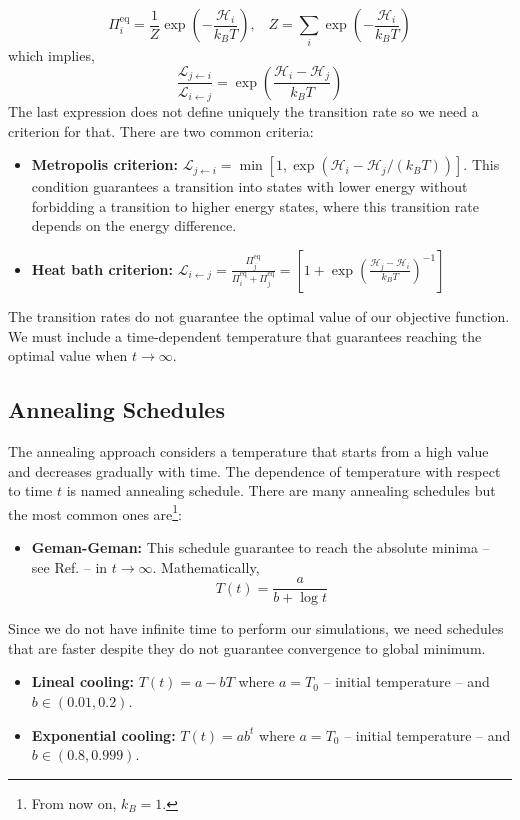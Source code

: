 \begin{equation}
    \Pi_{i}^{\mathrm{eq}} = \frac{1}{Z}\exp\left(- \frac{\mathcal{H}_{i}}{k_{B}T}\right), \;\;\; Z = \sum_{i}\exp\left(-\frac{\mathcal{H}_{i}}{k_{B}T}\right)
\end{equation}
which implies,
\begin{equation}
    \frac{\mathcal{L}_{j \leftarrow i}}{\mathcal{L}_{i \leftarrow j}} = \exp\left(\frac{\mathcal{H}_{i} - \mathcal{H}_{j}}{k_{B}T}\right)
\end{equation}
The last expression does not define uniquely the transition rate so we need a criterion for that. There are two common criteria:
\begin{itemize}
    \item\textbf{Metropolis criterion:} $\mathcal{L}_{j \leftarrow i} = \min \left[1,\exp\left(\mathcal{H}_{i}-\mathcal{H}_{j}/\left(k_{B}T\right)\right)\right]$. This condition guarantees a transition into states with lower energy without forbidding a transition to higher energy states, where this transition rate depends on the energy difference. 
    \item \textbf{Heat bath criterion:} $\mathcal{L}_{i \leftarrow j} = \frac{\Pi_{j}^{\mathrm{eq}}}{\Pi_{i}^{\mathrm{eq}} + \Pi_{j}^{\mathrm{eq}}} = \left[1 + \exp\left(\frac{\mathcal{H}_{j}- \mathcal{H}_{i}}{k_{B}T}\right)^{-1}\right]$ 
\end{itemize}
 The transition rates do not guarantee the optimal value of our objective function. We must include a time-dependent temperature that guarantees reaching the optimal value when $t \rightarrow \infty$. 
\subsection{Annealing Schedules}
The annealing approach considers a temperature that starts from a high value and decreases gradually with time. The dependence of temperature with respect to time $t$ is named annealing schedule. There are many annealing schedules but the most common ones are\footnote{From now on, $k_{B} = 1$.}:
\begin{itemize}
    \item \textbf{Geman-Geman:} This schedule guarantee to reach the absolute minima -- see Ref. \cite{Geman1984StochasticImages} -- in $t \rightarrow \infty$. Mathematically,
    \begin{equation}
        T(t) = \frac{a}{b + \log{t}}
    \end{equation}
\end{itemize}
Since we do not have infinite time to perform our simulations, we need schedules that are faster despite they do not guarantee convergence to global minimum. 
\begin{itemize}
    \item \textbf{Lineal cooling:} $T(t) = a - bT$ where $a = T_{0}$ -- initial temperature -- and $b \in (0.01,0.2)$.
    \item \textbf{Exponential cooling:} $T(t) = ab^{t}$ where $a = T_{0}$ -- initial temperature -- and $b \in (0.8,0.999)$.
\end{itemize}

